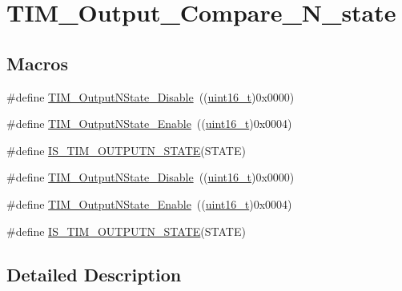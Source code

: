 \hypertarget{group___t_i_m___output___compare___n__state}{}\section{T\+I\+M\+\_\+\+Output\+\_\+\+Compare\+\_\+\+N\+\_\+state}
\label{group___t_i_m___output___compare___n__state}
\subsection*{Macros}
\begin{DoxyCompactItemize}
\item 
\#define \hyperlink{group___t_i_m___output___compare___n__state_gade8506a50fd6ba58273e9da81f6b0b54}{T\+I\+M\+\_\+\+Output\+N\+State\+\_\+\+Disable}~((\hyperlink{_p_e___types_8h_a1f1825b69244eb3ad2c7165ddc99c956}{uint16\+\_\+t})0x0000)
\item 
\#define \hyperlink{group___t_i_m___output___compare___n__state_gac4c08f9d66ce138c6978668020526c6f}{T\+I\+M\+\_\+\+Output\+N\+State\+\_\+\+Enable}~((\hyperlink{_p_e___types_8h_a1f1825b69244eb3ad2c7165ddc99c956}{uint16\+\_\+t})0x0004)
\item 
\#define \hyperlink{group___t_i_m___output___compare___n__state_ga81e27a982d9707f699451f30314c4274}{I\+S\+\_\+\+T\+I\+M\+\_\+\+O\+U\+T\+P\+U\+T\+N\+\_\+\+S\+T\+A\+TE}(S\+T\+A\+TE)
\item 
\#define \hyperlink{group___t_i_m___output___compare___n__state_gade8506a50fd6ba58273e9da81f6b0b54}{T\+I\+M\+\_\+\+Output\+N\+State\+\_\+\+Disable}~((\hyperlink{_p_e___types_8h_a1f1825b69244eb3ad2c7165ddc99c956}{uint16\+\_\+t})0x0000)
\item 
\#define \hyperlink{group___t_i_m___output___compare___n__state_gac4c08f9d66ce138c6978668020526c6f}{T\+I\+M\+\_\+\+Output\+N\+State\+\_\+\+Enable}~((\hyperlink{_p_e___types_8h_a1f1825b69244eb3ad2c7165ddc99c956}{uint16\+\_\+t})0x0004)
\item 
\#define \hyperlink{group___t_i_m___output___compare___n__state_ga81e27a982d9707f699451f30314c4274}{I\+S\+\_\+\+T\+I\+M\+\_\+\+O\+U\+T\+P\+U\+T\+N\+\_\+\+S\+T\+A\+TE}(S\+T\+A\+TE)
\end{DoxyCompactItemize}


\subsection{Detailed Description}


